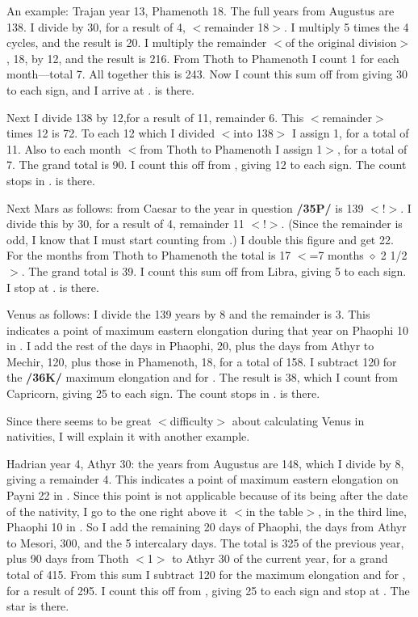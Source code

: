 An example: Trajan year 13, Phamenoth 18. The full years from Augustus are 138. I divide by 30,
for a result of 4, $<$remainder 18$>$. I multiply 5 times the 4 cycles, and the result is 20. I multiply the remainder $<$of the original division$>$, 18, by 12, and the result is 216. From Thoth to Phamenoth I count 1 for each month—total 7. All together this is 243. Now I count this sum off from \Cancer\xspace giving 30 to each sign, and I arrive at \Pisces. \Saturn\xspace is there.

Next I divide 138 by 12,for a result of 11, remainder 6. This $<$remainder$>$ times 12 is 72. To each 12 which I divided $<$into 138$>$ I assign 1, for a total of 11. Also to each month $<$from Thoth to Phamenoth I assign 1$>$, for a total of 7. The grand total is 90. I count this off from \Taurus, giving 12 to
each sign. The count stops in \Sagittarius. \Jupiter\xspace is there. 

Next Mars as follows: from Caesar to the year in question \textbf{/35P/} is 139 $<$!$>$. I divide this by 30, for a
result of 4, remainder 11 $<$!$>$. (Since the remainder is odd, I know that I must start counting from \Libra.) I double this figure and get 22. For the months from Thoth to Phamenoth the total is 17 $<$=7 months $\diamond$ 2 1/2$>$. The grand total is 39. I count this sum off from Libra, giving 5 to each sign. I stop at \Taurus. \Mars\xspace is there.

Venus as follows: I divide the 139 years by 8 and the remainder is 3. This indicates a point of maximum eastern elongation during that year on Phaophi 10 in \Sagittarius. I add the rest of the days in Phaophi, 20, plus the days from Athyr to Mechir, 120, plus those in Phamenoth, 18, for a total of 158. I subtract 120 for the \textbf{/36K/} maximum elongation and for \Sagittarius. The result is 38, which I count from Capricorn, giving 25 to each sign. The count stops in \Aquarius. \Venus\xspace is there.

Since there seems to be great $<$difficulty$>$ about calculating Venus in nativities, I will explain it with another example. 

Hadrian year 4, Athyr 30: the years from Augustus are 148, which I divide by 8, giving a remainder 4. This indicates a point of maximum eastern elongation on Payni 22 in \Leo. Since this point is not applicable because of its being after the date of the nativity, I go to the one right above it $<$in
the table$>$, in the third line, Phaophi 10 in \Sagittarius. So I add the remaining 20 days of Phaophi, the days from Athyr to Mesori, 300, and the 5 intercalary days. The total is 325 of the previous year, plus 90 days from Thoth $<$1$>$ to Athyr 30 of the current year, for a grand total of 415. From this sum I subtract 120 for the maximum elongation and for \Sagittarius, for a result of 295. I count this off from \Capricorn,
giving 25 to each sign and stop at \Sagittarius\xspace 20. The star is there.

